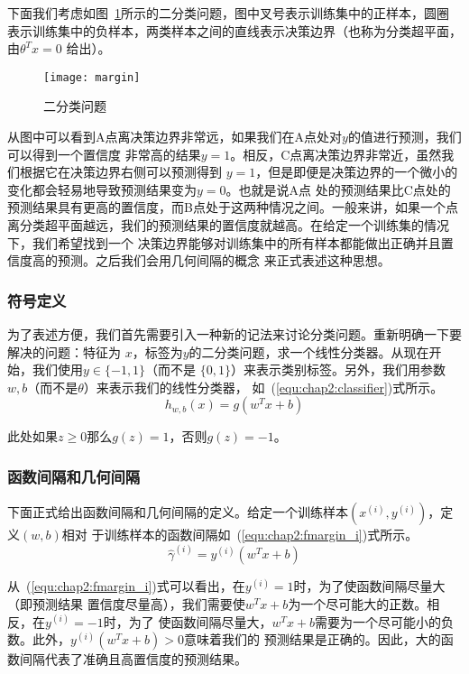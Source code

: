 下面我们考虑如图~\ref{fig:margin}所示的二分类问题，图中叉号表示训练集中的正样本，圆圈
表示训练集中的负样本，两类样本之间的直线表示决策边界（也称为分类超平面，由$\theta^Tx = 0$
给出）。
\begin{figure}[ht] %
  \centering
  \texttt{[image: margin]}
  \caption{二分类问题}
  \label{fig:margin}
\end{figure}

从图中可以看到A点离决策边界非常远，如果我们在A点处对$y$的值进行预测，我们可以得到一个置信度
非常高的结果$y = 1$。相反，C点离决策边界非常近，虽然我们根据它在决策边界右侧可以预测得到
$y = 1$，但是即便是决策边界的一个微小的变化都会轻易地导致预测结果变为$y = 0$。也就是说A点
处的预测结果比C点处的预测结果具有更高的置信度，而B点处于这两种情况之间。一般来讲，如果一个点
离分类超平面越远，我们的预测结果的置信度就越高。在给定一个训练集的情况下，我们希望找到一个
决策边界能够对训练集中的所有样本都能做出正确并且置信度高的预测。之后我们会用几何间隔的概念
来正式表述这种思想。

\subsubsection{符号定义}

为了表述方便，我们首先需要引入一种新的记法来讨论分类问题。重新明确一下要解决的问题：特征为
$x$，标签为$y$的二分类问题，求一个线性分类器。从现在开始，我们使用$y \in \{-1, 1\}$（而不是
$\{0, 1\}$）来表示类别标签。另外，我们用参数$w, b$（而不是$\theta$）来表示我们的线性分类器，
如~(\ref{equ:chap2:classifier})式所示。
\begin{equation}
  \label{equ:chap2:classifier}
  h_{w,b}(x) = g(w^Tx+b)
\end{equation}

此处如果$z \geq 0$那么$g(z) = 1$，否则$g(z) = -1$。

\subsubsection{函数间隔和几何间隔}

下面正式给出函数间隔和几何间隔的定义。给定一个训练样本$(x^{(i)},y^{(i)})$，定义$(w,b)$相对
于训练样本的函数间隔如~(\ref{equ:chap2:fmargin_i})式所示。
\begin{equation}
  \label{equ:chap2:fmargin_i}
  \hat{\gamma}^{(i)} = y^{(i)}(w^Tx+b)
\end{equation}

从~(\ref{equ:chap2:fmargin_i})式可以看出，在$y^{(i)} = 1$时，为了使函数间隔尽量大（即预测结果
置信度尽量高），我们需要使$w^Tx+b$为一个尽可能大的正数。相反，在$y^{(i)} = -1$时，为了
使函数间隔尽量大，$w^Tx+b$需要为一个尽可能小的负数。此外，$y^{(i)}(w^Tx+b) > 0$意味着我们的
预测结果是正确的。因此，大的函数间隔代表了准确且高置信度的预测结果。

